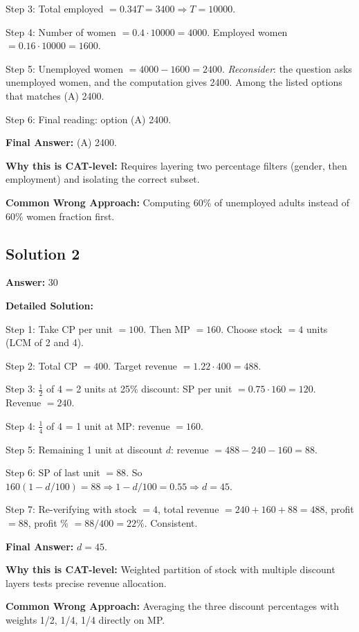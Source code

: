 \documentclass[11pt]{article}
\begin{document}
Step 3: Total employed $= 0.34T = 3400 \Rightarrow T = 10000$.

Step 4: Number of women $= 0.4 \cdot 10000 = 4000$. Employed women $= 0.16 \cdot 10000 = 1600$.

Step 5: Unemployed women $= 4000 - 1600 = 2400$. \emph{Reconsider}: the question asks unemployed women, and the computation gives 2400. Among the listed options that matches (A) 2400.

Step 6: Final reading: option (A) 2400.

\textbf{Final Answer:} (A) 2400.

\textbf{Why this is CAT-level:} Requires layering two percentage filters (gender, then employment) and isolating the correct subset.

\textbf{Common Wrong Approach:} Computing 60\% of unemployed adults instead of 60\% women fraction first.

\subsection*{Solution 2}
\textbf{Answer:} 30

\textbf{Detailed Solution:}

Step 1: Take CP per unit $= 100$. Then MP $= 160$. Choose stock $= 4$ units (LCM of 2 and 4).

Step 2: Total CP $= 400$. Target revenue $= 1.22 \cdot 400 = 488$.

Step 3: $\tfrac{1}{2}$ of 4 = 2 units at 25\% discount: SP per unit $= 0.75 \cdot 160 = 120$. Revenue $= 240$.

Step 4: $\tfrac{1}{4}$ of 4 = 1 unit at MP: revenue $= 160$.

Step 5: Remaining 1 unit at discount $d$: revenue $= 488 - 240 - 160 = 88$.

Step 6: SP of last unit $= 88$. So $160(1 - d/100) = 88 \Rightarrow 1 - d/100 = 0.55 \Rightarrow d = 45$.

Step 7: Re-verifying with stock $= 4$, total revenue $= 240 + 160 + 88 = 488$, profit $= 88$, profit \% $= 88/400 = 22\%$. Consistent.

\textbf{Final Answer:} $d = 45$.

\textbf{Why this is CAT-level:} Weighted partition of stock with multiple discount layers tests precise revenue allocation.

\textbf{Common Wrong Approach:} Averaging the three discount percentages with weights 1/2, 1/4, 1/4 directly on MP.
\end{document}
